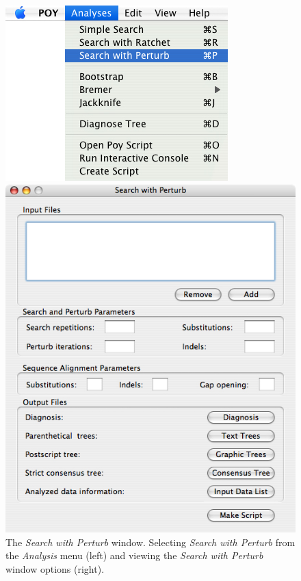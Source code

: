 \begin{figure}
\centering
\begin{minipage}[c]{0.48\textwidth}
   		\includegraphics[width=\textwidth]{doc/figures/searchwithperturb_menu.jpg}
\end{minipage}
\quad
\begin{minipage}[c]{0.48\textwidth}
	   	\includegraphics[width=\textwidth]{doc/figures/searchwithperturb_window.jpg}
   	\end{minipage} 
\caption{The \emph{Search with Perturb} window. Selecting \emph{Search with Perturb} from the \emph{Analysis} menu (left) and viewing the \emph{Search with Perturb} window options (right).}
\label{fig:search_with_perturb_window}
\end{figure}

